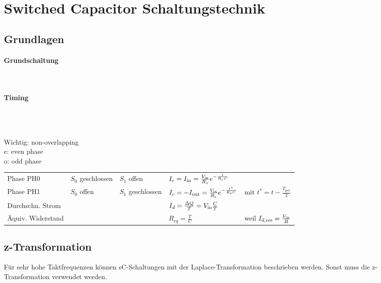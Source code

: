 \section{Switched Capacitor Schaltungstechnik}

\subsection{Grundlagen}

\begin{multicols}{2}
	\paragraph{Grundschaltung}~\\
	
	\vfill
	\columnbreak
	
	\paragraph{Timing}~\\
	\begin{center}
		 \\
		Wichtig: non-overlapping \\
		e: even phase \\
		o: odd phase
	\end{center}

\end{multicols}
	
\begin{tabular}{lllll}
	Phase PH0 & $S_0$ geschlossen & $S_1$ offen & $I_c = I_{\operatorname{\text{in}}} = \frac{V_{\operatorname{\text{in}}}}{R_s} e^{-\frac{t}{R_s C}}$ & \\
	Phase PH1 & $S_0$ offen & $S_1$ geschlossen & $I_c = -I_{\operatorname{\text{out}}} = \frac{V_{\operatorname{\text{in}}}}{R_s} e^{-\frac{t^*}{R_s C}}$ & mit $t^* = t - \frac{T_{\text{per}}}{2}$ \\
	Durchschn. Strom & & & $I_d = \frac{\Delta Q}{T} = V_{\operatorname{\text{in}}} \frac{C}{T}$ \\
	Äquiv. Widerstand & & & $R_{eq} = \frac{T}{C}$ & weil $I_{d,\text{res}} = \frac{V_{\operatorname{\text{in}}}}{R}$ \\
\end{tabular}
	 
\subsection{z-Transformation}
Für sehr hohe Taktfrequenzen können sC-Schaltungen mit der Laplace-Transformation beschrieben werden.
Sonst muss die z-Transformation verwendet werden.

